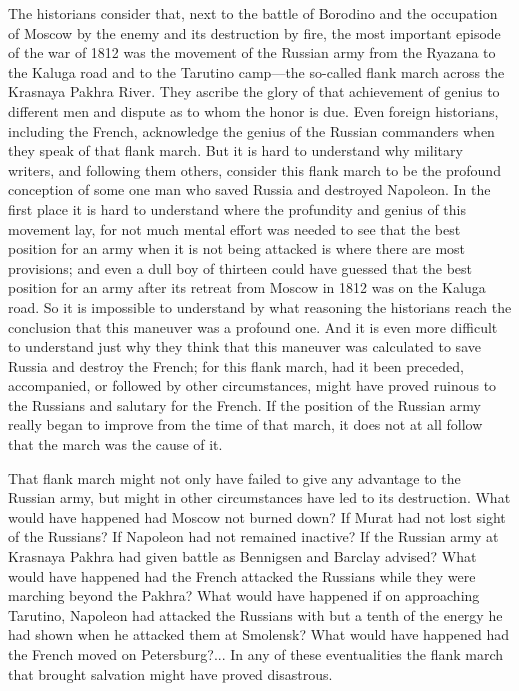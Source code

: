 The historians consider that, next to the battle of Borodino and
the occupation of Moscow by the enemy and its destruction by
fire, the most important episode of the war of 1812 was the
movement of the Russian army from the Ryazana to the Kaluga road
and to the Tarutino camp---the so-called flank march across the
Krasnaya Pakhra River. They ascribe the glory of that achievement
of genius to different men and dispute as to whom the honor is
due. Even foreign historians, including the French, acknowledge
the genius of the Russian commanders when they speak of that
flank march. But it is hard to understand why military writers,
and following them others, consider this flank march to be the
profound conception of some one man who saved Russia and
destroyed Napoleon. In the first place it is hard to understand
where the profundity and genius of this movement lay, for not
much mental effort was needed to see that the best position for
an army when it is not being attacked is where there are most
provisions; and even a dull boy of thirteen could have guessed
that the best position for an army after its retreat from Moscow
in 1812 was on the Kaluga road. So it is impossible to understand
by what reasoning the historians reach the conclusion that this
maneuver was a profound one. And it is even more difficult to
understand just why they think that this maneuver was calculated
to save Russia and destroy the French; for this flank march, had
it been preceded, accompanied, or followed by other
circumstances, might have proved ruinous to the Russians and
salutary for the French. If the position of the Russian army
really began to improve from the time of that march, it does not
at all follow that the march was the cause of it.

That flank march might not only have failed to give any advantage
to the Russian army, but might in other circumstances have led to
its destruction. What would have happened had Moscow not burned
down? If Murat had not lost sight of the Russians? If Napoleon
had not remained inactive? If the Russian army at Krasnaya Pakhra
had given battle as Bennigsen and Barclay advised? What would
have happened had the French attacked the Russians while they
were marching beyond the Pakhra? What would have happened if on
approaching Tarutino, Napoleon had attacked the Russians with but
a tenth of the energy he had shown when he attacked them at
Smolensk? What would have happened had the French moved on
Petersburg?... In any of these eventualities the flank march that
brought salvation might have proved disastrous.

